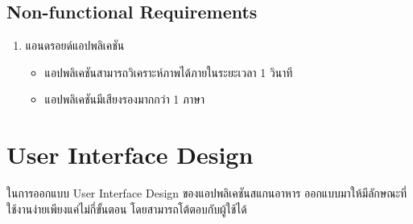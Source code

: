 		\subsection{Non-functional Requirements}
		\begin{enumerate}
		\item แอนดรอยด์แอปพลิเคชัน
		\begin{itemize}[label={--}]
			\item  แอปพลิเคชันสามารถวิเคราะห์ภาพได้ภายในระยะเวลา 1 วินาที 
			\item  แอปพลิเคชันมีเสียงรองมากกว่า 1 ภาษา
		
		\end{itemize}
	\end{enumerate}
	
\section{User Interface Design}
ในการออกแบบ User Interface Design ของแอปพลิเคชันสแกนอาหาร ออกแบบมาให้มีลักษณะที่ใช้งานง่ายเพียงแค่ไม่กี่ขั้นตอน โดยสามารถโต้ตอบกับผู้ใช้ได้ 

				\newpage

